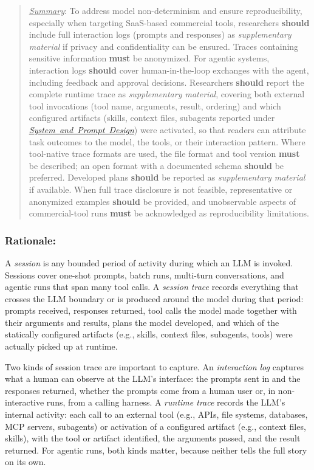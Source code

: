 \documentclass[smallextended]{svjour3}
\newcommand{\must}{\textbf{must}\xspace}
\newcommand{\should}{\textbf{should}\xspace}
\newcommand{\summary}{\underline{\emph{Summary}}\xspace}
\newcommand{\summary}{\textbf{\emph{Summary}}\xspace}
\newcommand{\supplementarymaterial}{\emph{supplementary material}\xspace}
\newcommand{\supplementarymaterial}{\emph{supplementary material}\xspace}
\newenvironment{framed}{\begin{quote}}{\end{quote}}
\newcommand{\design}{\hyperref[sec:report-system-and-prompt-design]{\mbox{\emph{System and Prompt Design}}}\xspace}
\newcommand{\design}{\href{/guidelines/design/}{\emph{System and Prompt Design}}\xspace}
\newcommand{\guidelinesubsubsection}[1]{\subsubsection{\bfseries #1:}}
\newcommand{\guidelinesubsubsection}[1]{\subsubsection{#1}}
\begin{document}
\vspace{0.5\baselineskip}
\begin{framed}
\summary: %
To address model non-determinism and ensure reproducibility, especially when targeting SaaS-based commercial tools, researchers \should include full interaction logs (prompts and responses) as \supplementarymaterial if privacy and confidentiality can be ensured. Traces containing sensitive information \must be anonymized. For agentic systems, interaction logs \should cover human-in-the-loop exchanges with the agent, including feedback and approval decisions. Researchers \should report the complete runtime trace as \supplementarymaterial, covering both external tool invocations (tool name, arguments, result, ordering) and which configured artifacts (skills, context files, subagents reported under \design) were activated, so that readers can attribute task outcomes to the model, the tools, or their interaction pattern. Where tool-native trace formats are used, the file format and tool version \must be described; an open format with a documented schema \should be preferred. Developed plans \should be reported as \supplementarymaterial if available. When full trace disclosure is not feasible, representative or anonymized examples \should be provided, and unobservable aspects of commercial-tool runs \must be acknowledged as reproducibility limitations.
\end{framed}

\guidelinesubsubsection{Rationale}

A \emph{session} is any bounded period of activity during which an LLM is invoked. Sessions cover one-shot prompts, batch runs, multi-turn conversations, and agentic runs that span many tool calls.
A \emph{session trace} records everything that crosses the LLM boundary or is produced around the model during that period: prompts received, responses returned, tool calls the model made together with their arguments and results, plans the model developed, and which of the statically configured artifacts (e.g., skills, context files, subagents, tools) were actually picked up at runtime.

Two kinds of session trace are important to capture.
An \emph{interaction log} captures what a human can observe at the LLM's interface: the prompts sent in and the responses returned, whether the prompts come from a human user or, in non-interactive runs, from a calling harness.
A \emph{runtime trace} records the LLM's internal activity: each call to an external tool (e.g., APIs, file systems, databases, MCP servers, subagents) or activation of a configured artifact (e.g., context files, skills), with the tool or artifact identified, the arguments passed, and the result returned. For agentic runs, both kinds matter, because neither tells the full story on its own.
\end{document}
